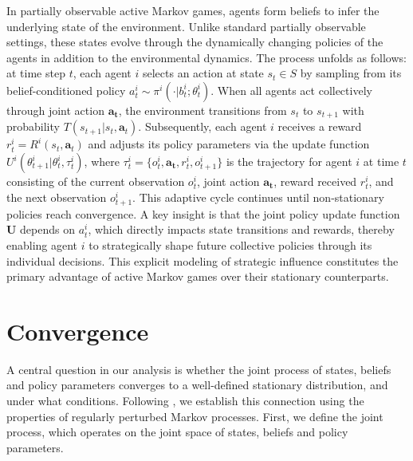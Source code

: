 In partially observable active Markov games, agents form beliefs to infer the underlying state of the environment. Unlike standard partially observable settings, these states evolve through the dynamically changing policies of the agents in addition to the environmental dynamics. The process unfolds as follows: at time step $t$, each agent $i$ selects an action at state $s_t \in S$ by sampling from its belief-conditioned policy $a^i_t \sim \pi^i(\cdot|b^i_t; \theta^i_t)$. When all agents act collectively through joint action $\boldsymbol{a_t}$, the environment transitions from $s_t$ to $s_{t+1}$ with probability $T(s_{t+1}|s_t, \boldsymbol{a}_t)$. Subsequently, each agent $i$ receives a reward $r^i_t = R^i(s_t, \boldsymbol{a}_t)$ and adjusts its policy parameters via the update function $U^i(\theta^i_{t+1}|\theta^i_t, \tau^i_t)$, where $\tau^i_t = \{o_t^i, \boldsymbol{a_t}, r^i_t, o_{t+1}^i\}$ is the trajectory for agent $i$ at time $t$ consisting of the current observation $o_t^i$, joint action $\boldsymbol{a_t}$, reward received $r^i_t$, and the next observation $o_{t+1}^i$. This adaptive cycle continues until non-stationary policies reach convergence. A key insight is that the joint policy update function $\boldsymbol{U}$ depends on $a^i_t$, which directly impacts state transitions and rewards, thereby enabling agent $i$ to strategically shape future collective policies through its individual decisions. This explicit modeling of strategic influence constitutes the primary advantage of active Markov games over their stationary counterparts.

\section{Convergence}
A central question in our analysis is whether the joint process of states, beliefs and policy parameters converges to a well-defined stationary distribution, and under what conditions. Following \citet{kim2022influencing}, we establish this connection using the properties of regularly perturbed Markov processes. First, we define the joint process, which operates on the joint space of states, beliefs and policy parameters.

